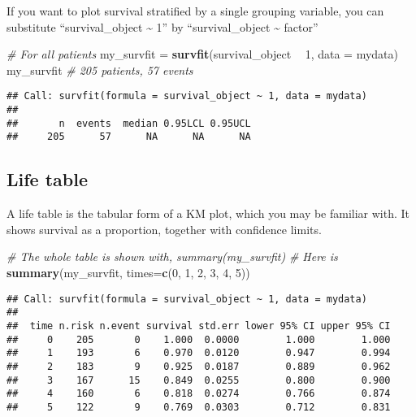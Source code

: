 \documentclass[]{book}
\makeatletter
\newenvironment{Shaded}{\begin{snugshade}}{\end{snugshade}}
\newcommand{\KeywordTok}[1]{\textcolor[rgb]{0.13,0.29,0.53}{\textbf{#1}}}
\newcommand{\DataTypeTok}[1]{\textcolor[rgb]{0.13,0.29,0.53}{#1}}
\newcommand{\DecValTok}[1]{\textcolor[rgb]{0.00,0.00,0.81}{#1}}
\newcommand{\StringTok}[1]{\textcolor[rgb]{0.31,0.60,0.02}{#1}}
\newcommand{\CommentTok}[1]{\textcolor[rgb]{0.56,0.35,0.01}{\textit{#1}}}
\newcommand{\OperatorTok}[1]{\textcolor[rgb]{0.81,0.36,0.00}{\textbf{#1}}}
\newcommand{\NormalTok}[1]{#1}
\newenvironment{kframe}{%
\medskip{}
\setlength{\fboxsep}{.8em}
 \def\at@end@of@kframe{}%
 \ifinner\ifhmode%
  \def\at@end@of@kframe{\end{minipage}}%
  \begin{minipage}{\columnwidth}%
 \fi\fi%
 \def\FrameCommand##1{\hskip\@totalleftmargin \hskip-\fboxsep
 \colorbox{shadecolor}{##1}\hskip-\fboxsep
     \hskip-\linewidth \hskip-\@totalleftmargin \hskip\columnwidth}%
 \MakeFramed {\advance\hsize-\width
   \@totalleftmargin\z@ \linewidth\hsize
   \@setminipage}}%
 {\par\unskip\endMakeFramed%
 \at@end@of@kframe}
\renewenvironment{Shaded}{\begin{kframe}}{\end{kframe}}
\theoremstyle{definition}
\theoremstyle{definition}
\theoremstyle{definition}
\theoremstyle{remark}
\makeatother
\begin{document}
If you want to plot survival stratified by a single grouping variable,
you can substitute ``survival\_object \textasciitilde{} 1'' by
``survival\_object \textasciitilde{} factor''

\begin{Shaded}
\begin{Highlighting}[]
\CommentTok{# For all patients}
\NormalTok{my_survfit =}\StringTok{ }\KeywordTok{survfit}\NormalTok{(survival_object }\OperatorTok{~}\StringTok{ }\DecValTok{1}\NormalTok{, }\DataTypeTok{data =}\NormalTok{ mydata)}
\NormalTok{my_survfit }\CommentTok{# 205 patients, 57 events}
\end{Highlighting}
\end{Shaded}

\begin{verbatim}
## Call: survfit(formula = survival_object ~ 1, data = mydata)
## 
##       n  events  median 0.95LCL 0.95UCL 
##     205      57      NA      NA      NA
\end{verbatim}

\subsection{Life table}\label{life-table}

A life table is the tabular form of a KM plot, which you may be familiar
with. It shows survival as a proportion, together with confidence
limits.

\begin{Shaded}
\begin{Highlighting}[]
\CommentTok{# The whole table is shown with, summary(my_survfit)}
\CommentTok{# Here is }
\KeywordTok{summary}\NormalTok{(my_survfit, }\DataTypeTok{times=}\KeywordTok{c}\NormalTok{(}\DecValTok{0}\NormalTok{, }\DecValTok{1}\NormalTok{, }\DecValTok{2}\NormalTok{, }\DecValTok{3}\NormalTok{, }\DecValTok{4}\NormalTok{, }\DecValTok{5}\NormalTok{))}
\end{Highlighting}
\end{Shaded}

\begin{verbatim}
## Call: survfit(formula = survival_object ~ 1, data = mydata)
## 
##  time n.risk n.event survival std.err lower 95% CI upper 95% CI
##     0    205       0    1.000  0.0000        1.000        1.000
##     1    193       6    0.970  0.0120        0.947        0.994
##     2    183       9    0.925  0.0187        0.889        0.962
##     3    167      15    0.849  0.0255        0.800        0.900
##     4    160       6    0.818  0.0274        0.766        0.874
##     5    122       9    0.769  0.0303        0.712        0.831
\end{verbatim}
\end{document}
